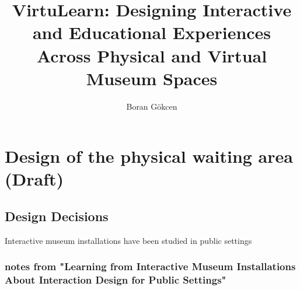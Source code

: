 \documentclass{article}
\title{VirtuLearn: Designing Interactive and Educational Experiences Across Physical and Virtual Museum Spaces}
\author{Boran Gökcen}
\begin{document}
\maketitle

\section{Design of the physical waiting area (Draft)}
\subsection{Design Decisions}
    Interactive museum installations have been studied in public settings \cite{hornecker_learning_2006}
\subsubsection{notes from "Learning from Interactive Museum Installations  About Interaction Design for Public Settings"}
\end{document}
